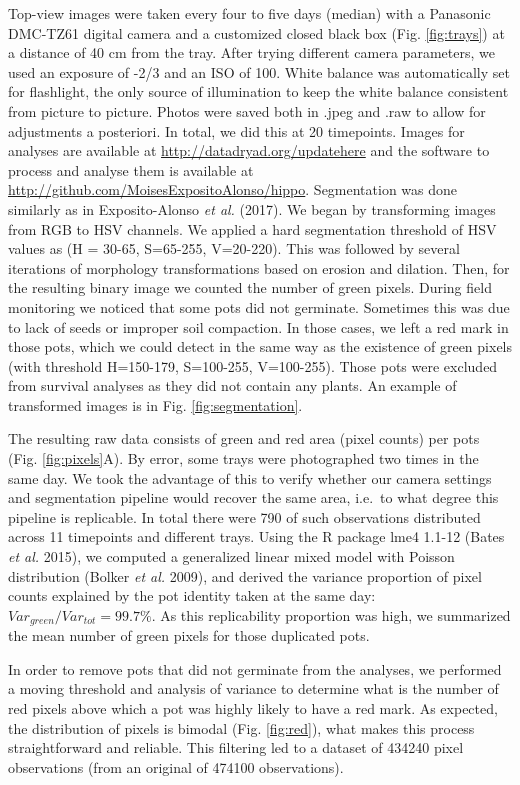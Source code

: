 \documentclass[12pt,]{article}
\begin{document}
Top-view images were taken every four to five days (median) with a
Panasonic DMC-TZ61 digital camera and a customized closed black box
(Fig. \ref{fig:trays}) at a distance of 40 cm from the tray. After
trying different camera parameters, we used an exposure of -2/3 and an
ISO of 100. White balance was automatically set for flashlight, the only
source of illumination to keep the white balance consistent from picture
to picture. Photos were saved both in .jpeg and .raw to allow for
adjustments a posteriori. In total, we did this at 20 timepoints. Images
for analyses are available at \url{http://datadryad.org/updatehere} and
the software to process and analyse them is available at
\url{http://github.com/MoisesExpositoAlonso/hippo}. Segmentation was
done similarly as in Exposito-Alonso \emph{et al.} (2017). We began by
transforming images from RGB to HSV channels. We applied a hard
segmentation threshold of HSV values as (H = 30-65, S=65-255, V=20-220).
This was followed by several iterations of morphology transformations
based on erosion and dilation. Then, for the resulting binary image we
counted the number of green pixels. During field monitoring we noticed
that some pots did not germinate. Sometimes this was due to lack of
seeds or improper soil compaction. In those cases, we left a red mark in
those pots, which we could detect in the same way as the existence of
green pixels (with threshold H=150-179, S=100-255, V=100-255). Those
pots were excluded from survival analyses as they did not contain any
plants. An example of transformed images is in Fig.
\ref{fig:segmentation}.

The resulting raw data consists of green and red area (pixel counts) per
pots (Fig. \ref{fig:pixels}A). By error, some trays were photographed
two times in the same day. We took the advantage of this to verify
whether our camera settings and segmentation pipeline would recover the
same area, i.e.~to what degree this pipeline is replicable. In total
there were 790 of such observations distributed across 11 timepoints and
different trays. Using the R package lme4 1.1-12 (Bates \emph{et al.}
2015), we computed a generalized linear mixed model with Poisson
distribution (Bolker \emph{et al.} 2009), and derived the variance
proportion of pixel counts explained by the pot identity taken at the
same day: \(Var_{green} / Var_{tot} = 99.7 \%\). As this replicability
proportion was high, we summarized the mean number of green pixels for
those duplicated pots.

In order to remove pots that did not germinate from the analyses, we
performed a moving threshold and analysis of variance to determine what
is the number of red pixels above which a pot was highly likely to have
a red mark. As expected, the distribution of pixels is bimodal (Fig.
\ref{fig:red}), what makes this process straightforward and reliable.
This filtering led to a dataset of 434240 pixel observations (from an
original of 474100 observations).
\end{document}
